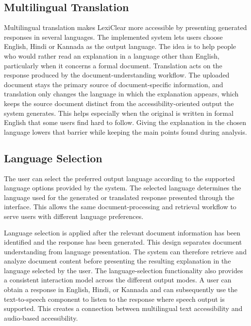 \documentclass[12pt,a4paper,oneside]{report}
\begin{document}
\subsection{Multilingual Translation}

Multilingual translation makes LexiClear more accessible by presenting generated responses in several languages. The implemented system lets users choose English, Hindi or Kannada as the output language. The idea is to help people who would rather read an explanation in a language other than English, particularly when it concerns a formal document. Translation acts on the response produced by the document-understanding workflow. The uploaded document stays the primary source of document-specific information, and translation only changes the language in which the explanation appears, which keeps the source document distinct from the accessibility-oriented output the system generates. This helps especially when the original is written in formal English that some users find hard to follow. Giving the explanation in the chosen language lowers that barrier while keeping the main points found during analysis.

\subsection{Language Selection}

The user can select the preferred output language according to the supported language options provided by the system. The selected language determines the language used for the generated or translated response presented through the interface. This allows the same document-processing and retrieval workflow to serve users with different language preferences.

Language selection is applied after the relevant document information has been identified and the response has been generated. This design separates document understanding from language presentation. The system can therefore retrieve and analyze document content before presenting the resulting explanation in the language selected by the user. The language-selection functionality also provides a consistent interaction model across the different output modes. A user can obtain a response in English, Hindi, or Kannada and can subsequently use the text-to-speech component to listen to the response where speech output is supported. This creates a connection between multilingual text accessibility and audio-based accessibility.
\end{document}
